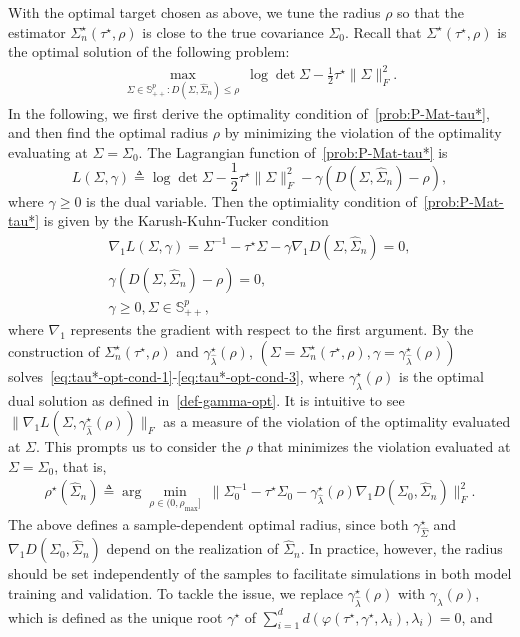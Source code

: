 \documentclass[11pt]{article}
\def\S{\mathbb{S}}
\newcommand{\opt}{^\star}
\newcommand{\Let}{\triangleq}
\def\S{\mathbb{S}}
\def\PD{{\S^p_{++}}}
\newcommand{\wh}{\widehat}
\begin{document}
With the optimal target chosen as above, we tune the radius $ \rho$ so that the estimator $\Sigma_n\opt(\tau\opt,\rho)$ is close to the true covariance $\Sigma_0$. Recall that $\Sigma\opt(\tau\opt,\rho)$ is the optimal solution of the following problem:
\begin{align}\label{prob:P-Mat-tau*}
    \max_{\Sigma\in\PD: D(\Sigma, \widehat{\Sigma}_n)\leq  \rho}~\log\det \Sigma - \frac{1}{2}\tau\opt \|\Sigma\|_F^2.
\end{align}
In the following, we first derive the optimality condition of~\eqref{prob:P-Mat-tau*}, and then find the optimal radius $ \rho$ by minimizing the violation of the optimality evaluating at $\Sigma=\Sigma_0$. The Lagrangian function of~\eqref{prob:P-Mat-tau*} is
\[
    L(\Sigma,\gamma) \Let \log\det \Sigma - \frac{1}{2}\tau\opt\|\Sigma\|_F^2 - \gamma (D(\Sigma,\wh\Sigma_n)-\rho),
\]
where $\gamma\geq 0$ is the dual variable. Then the optimiality condition of~\eqref{prob:P-Mat-tau*} is given by the Karush-Kuhn-Tucker condition
\begin{align}
    \nabla_1 L(\Sigma,\gamma) = \Sigma^{-1} - \tau\opt \Sigma - \gamma \nabla_1 D(\Sigma,\wh\Sigma_n) = 0,\label{eq:tau*-opt-cond-1}\\
    \gamma (D(\Sigma, \wh\Sigma_n)-\rho) = 0,\label{eq:tau*-opt-cond-2}\\
    \gamma \geq 0, \Sigma\in\PD\label{eq:tau*-opt-cond-3},
\end{align}
where $\nabla_1$ represents the gradient with respect to the first argument. By the construction of $\Sigma_n\opt(\tau\opt,\rho)$ and $\gamma\opt_{\wh\lambda}(\rho)$, $(\Sigma=\Sigma_n\opt(\tau\opt,\rho),\gamma=\gamma\opt_{\wh\lambda}(\rho))$ solves~\eqref{eq:tau*-opt-cond-1}-\eqref{eq:tau*-opt-cond-3}, where $\gamma\opt_{\wh\lambda}(\rho)$ is the optimal dual solution as defined in~\eqref{def-gamma-opt}.
It is intuitive to see $\|\nabla_1 L(\Sigma,\gamma\opt_{\wh\lambda}(\rho))\|_F$ as a measure of the violation of the optimality evaluated at $\Sigma$.
This prompts us to consider the 
$\rho$ that minimizes the violation evaluated at $\Sigma=\Sigma_0$, that is, 
\begin{align}
     \rho^\star(\wh\Sigma_n) \Let \arg\min_{ \rho\in(0,\rho_{\max}]}\;\|\Sigma_0^{-1}-\tau\opt \Sigma_0-\gamma_{\wh\lambda}\opt( \rho)  {\nabla_1 D } (\Sigma_0, \wh \Sigma_n)\|_F^2. \label{eq:opt-eps-1}
\end{align}
The above defines a sample-dependent optimal radius, since both $\gamma\opt_{\wh\Sigma}$ and $\nabla_1 D(\Sigma_0,\wh\Sigma_n)$ depend on the realization of $\wh\Sigma_n$. In practice, however, the radius should be set independently of the samples to facilitate simulations in both model training and validation. To tackle the issue, we replace $\gamma_{\wh\lambda}\opt(\rho)$ with $\gamma_{\lambda}(\rho)$, which is defined as the unique root $\gamma\opt$ of $\sum_{i=1}^d d(\varphi(\tau\opt,\gamma\opt,\lambda_i),\lambda_i)=0$, and 
\end{document}
